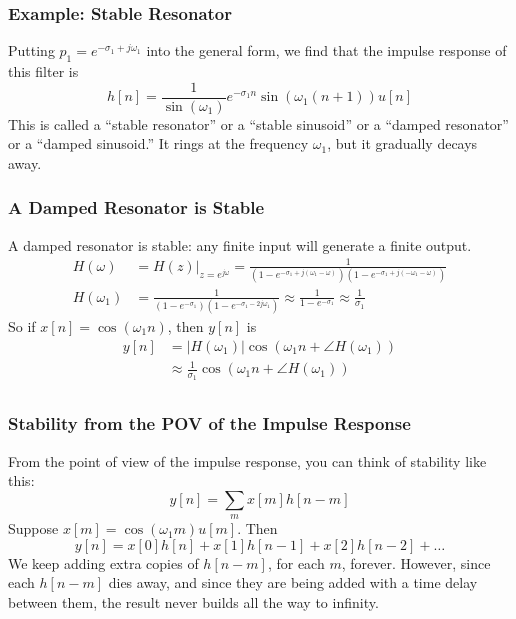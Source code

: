 \documentclass{beamer}
\begin{document}
\begin{frame}
  \frametitle{Example: Stable Resonator}

  Putting $p_1=e^{-\sigma_1+j\omega_1}$ into the general form, we find that the
  impulse response of this filter is
  \[
  h[n] = \frac{1}{\sin(\omega_1)}e^{-\sigma_1 n}\sin(\omega_1 (n+1))u[n]
  \]
  This is called a ``stable resonator'' or a ``stable sinusoid'' or a
  ``damped resonator'' or a ``damped sinusoid.''  It rings at the
  frequency $\omega_1$, but it gradually decays away.
\end{frame}

\begin{frame}
  \centerline{}
\end{frame}

\begin{frame}
  \frametitle{A Damped Resonator is Stable}

  A damped resonator is stable: any finite input will generate a
  finite output.  
  \begin{align*}
    H(\omega) &= H(z)\vert_{z=e^{j\omega}} = \frac{1}{(1-e^{-\sigma_1+j(\omega_1-\omega)})(1-e^{-\sigma_1+j(-\omega_1-\omega)})}\\
    H(\omega_1) &= \frac{1}{(1-e^{-\sigma_1})(1-e^{-\sigma_1-2j\omega_1})}\approx
    \frac{1}{1-e^{-\sigma_1}}\approx \frac{1}{\sigma_1}
  \end{align*}
  So if $x[n]=\cos(\omega_1 n)$, then $y[n]$ is
  \begin{align*}
    y[n] &= |H(\omega_1)|\cos\left(\omega_1 n+\angle H(\omega_1)\right) \\
    &\approx  \frac{1}{\sigma_1}\cos\left(\omega_1 n+\angle H(\omega_1)\right) \\
  \end{align*}
\end{frame}

\begin{frame}
  \centerline{}
\end{frame}

\begin{frame}
  \frametitle{Stability from the POV of the Impulse Response}
  From the point of view of the impulse response, you can think of stability like this:
  \[
  y[n] = \sum_m x[m]h[n-m]
  \]
  Suppose $x[m] = \cos(\omega_1 m)u[m]$.   Then
  \[
  y[n] = x[0]h[n] + x[1]h[n-1] + x[2]h[n-2] + \ldots
  \]
  We keep adding extra copies of $h[n-m]$, for each $m$, forever.
  However, since each $h[n-m]$ dies away, and since they are
  being added with a time delay between them, the result never builds
  all the way to infinity.
\end{frame}
\end{document}
